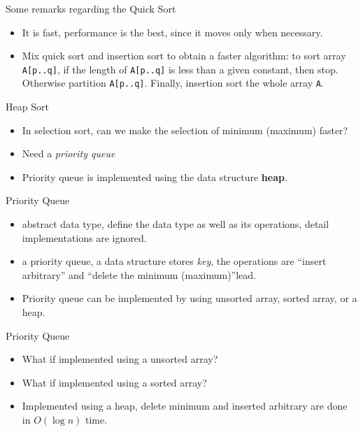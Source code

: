 \documentclass{beamer}
\begin{document}
\begin{frame}{}
\begin{center}
Some remarks regarding the Quick Sort
\end{center}
\begin{itemize}
\item It is fast, performance is the best, since it moves only when necessary.
\item Mix quick sort and insertion sort to obtain a faster algorithm: to sort
 array {\tt A[p..q]}, if the length of {\tt A[p..q]} is less than a
 given constant, then stop.  
 Otherwise partition {\tt A[p..q]}.  Finally, insertion sort the whole 
 array {\tt A}.
\end{itemize}
\end{frame}

\begin{frame}{}
\begin{center}
{\large Heap Sort}
\end{center}
\begin{itemize}
\item In selection sort, can we make the selection of minimum (maximum) faster?
\item Need a {\it priority queue}
\item Priority queue is implemented using the data structure {\bf heap}.  
\end{itemize}
\end{frame}

\begin{frame}{}
\begin{center}
Priority Queue
\end{center}
\begin{itemize}
\item abstract data type, define the data type as well as its operations, 
 detail implementations are ignored.  
\item a priority queue, a data structure stores {\it key}, the operations are
 ``insert arbitrary'' and ``delete the minimum (maximum)''lead.  
\item Priority queue can be implemented by using unsorted array, 
 sorted array, or a heap.  
\end{itemize}
\end{frame}

\begin{frame}{}
\begin{center}
Priority Queue
\end{center}
\begin{itemize}
\item What if implemented using a unsorted array?
\item What if implemented using a sorted array?
\item Implemented using a heap, delete minimum and inserted arbitrary are done
 in $O(\log n)$ time. 
\end{itemize}
\end{frame}
\end{document}
